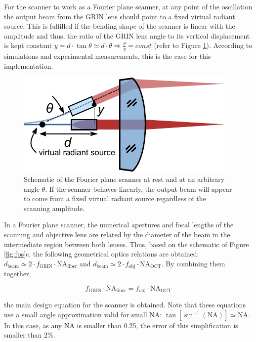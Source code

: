 \documentclass[10pt]{iopart}
\begin{document}
For the scanner to work as a Fourier plane scanner, at any point of the oscillation the output beam from the GRIN lens should point to a fixed virtual radiant source. This is fulfilled if the bending shape of the scanner is linear with the amplitude and thus, the ratio of the GRIN lens angle to its vertical displacement is kept constant $ y = d \cdot \tan \theta \simeq d \cdot \theta \Rightarrow \frac{\theta}{y} = const $ (refer to Figure \ref{fig:radiant}). According to simulations and experimental measurements, this is the case for this implementation.

\begin{figure}[h!]\centering
      \includegraphics{figures/radiant.pdf}
      \caption{Schematic of the Fourier plane scanner at rest and at an arbitrary angle $\theta$. If the scanner behaves linearly, the output beam will appear to come from a fixed virtual radiant source regardless of the scanning amplitude.}
      \label{fig:radiant}
\end{figure}


In a Fourier plane scanner, the numerical apertures and focal lengths of the scanning and objective lens are related by the diameter of the beam in the intermediate region between both lenses. Thus, based on the schematic of Figure \ref{fig:fps}c, the following geometrical optics relations are obtained: $d_\mathrm{beam} \simeq 2\cdot f_\mathrm{GRIN}\cdot \mathrm{NA}_\mathrm{fiber}$ and $d_\mathrm{beam} \simeq 2 \cdot f_\mathrm{obj}\cdot \mathrm{NA}_\mathrm{OCT}$. By combining them together,

\begin{equation}
f_\mathrm{GRIN} \cdot \mathrm{NA}_\mathrm{fiber} = f_\mathrm{obj} \cdot \mathrm{NA}_\mathrm{OCT}
\label{eq:fpsNA}
\end{equation}

the main design equation for the scanner is obtained. Note that these equations use a small angle approximation valid for small NA:  $\tan[\sin^{-1}(\mathrm{NA})] \simeq \mathrm{NA} $. In this case, as any NA is smaller than 0.25, the error of this simplification is smaller than 2\%.
\end{document}
